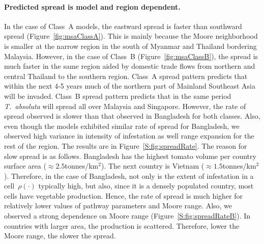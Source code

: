 \documentclass[11pt]{article}
\newcommand{\tuta}{\emph{T.~absoluta}}
\newcommand{\infest}{\rho}
\theoremstyle{definition}
\begin{document}
\paragraph{Predicted spread is model and region dependent.} In the case of Class~A
models, the eastward spread is faster than southward spread
(Figure~\ref{fig:msaClassA}). This is mainly because the Moore neighborhood
is smaller at the narrow region in the south of Myanmar and Thailand
bordering Malaysia.  However, in the case of Class~B
(Figure~\ref{fig:msaClassB}), the spread is much faster in the same region
aided by domestic trade flows from northern and central Thailand to the
southern region.  Class~A spread pattern predicts that within the next 4-5
years much of the northern part of Mainland Southeast Asia will be invaded.
Class~B spread pattern predicts that in the same period \tuta{} will spread
all over Malaysia and Singapore.  However, the rate of spread observed is
slower than that observed in Bangladesh for both classes. Also, even though
the models exhibited similar rate of spread for Bangladesh, we observed
high variance in intensity of infestation as well range expansion for the
rest of the region. The results are in Figure~\ref{S:fig:spreadRate}. The
reason for slow spread is as follows.  Bangladesh has the highest tomato
volume per country surface area ($\approx2.5$tonnes/km$^2$).  The next
country is Vietnam ($\approx1.5$tonnes/km$^2$). Therefore, in the case of
Bangladesh, not only is the extent of infestation in a
cell~$\infest(\cdot)$ typically high, but also, since it is a densely
populated country, most cells have vegetable production. Hence, the rate of
spread is much higher for relatively lower values of pathway parameters and
Moore range. Also, we observed a strong dependence on Moore range
(Figure~\ref{S:fig:spreadRateB}).  In countries with larger area, the
production is scattered. Therefore, lower the Moore range, the slower the
spread.
\end{document}
